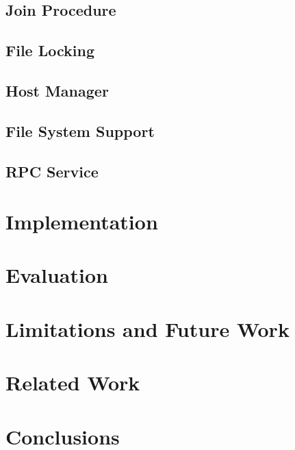 \documentclass[letterpaper,twocolumn,10pt]{article}
\begin{document}
%    

\subsection{Join Procedure}
\label{sec:joinProcedure}


\subsection{File Locking}
\label{sec:fileLocking}


\subsection{Host Manager}
\label{sec:hostManager}


\subsection{File System Support}
\label{sec:fsSupport}


\subsection{RPC Service}
\label{sec:rpcService}


\section{Implementation}
\label{sec:implementation}


\section{Evaluation}
\label{sec:evaluation}


\section{Limitations and Future Work}
\label{sec:limitations}


\section{Related Work}
\label{sec:relatedWork}


\section{Conclusions}


{\footnotesize 
}


\theendnotes
\end{document}

